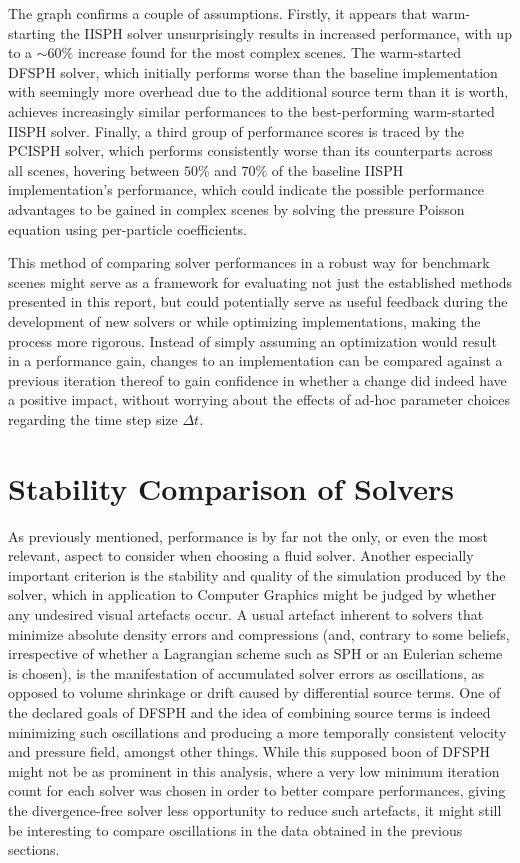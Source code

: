 \documentclass[oneside, a4paper]{book}
\begin{document}
  

  The graph confirms a couple of assumptions. Firstly, it appears that warm-starting the IISPH solver unsurprisingly results in increased performance, with up to a $\sim60\%$ increase found for the most complex scenes. The warm-started DFSPH solver, which initially performs worse than the baseline implementation with seemingly more overhead due to the additional source term than it is worth, achieves increasingly similar performances to the best-performing warm-started IISPH solver. Finally, a third group of performance scores is traced by the PCISPH solver, which performs consistently worse than its counterparts across all scenes, hovering between $50\%$ and $70\%$ of the baseline IISPH implementation's performance, which could indicate the possible performance advantages to be gained in complex scenes by solving the pressure Poisson equation using per-particle coefficients.

  This method of comparing solver performances in a robust way for benchmark scenes might serve as a framework for evaluating not just the established methods presented in this report, but could potentially serve as useful feedback during the development of new solvers or while optimizing implementations, making the process more rigorous. Instead of simply assuming an optimization would result in a performance gain, changes to an implementation can be compared against a previous iteration thereof to gain confidence in whether a change did indeed have a positive impact, without worrying about the effects of ad-hoc parameter choices regarding the time step size $\Delta t$.

  \section{Stability Comparison of Solvers}
  As previously mentioned, performance is by far not the only, or even the most relevant, aspect to consider when choosing a fluid solver. Another especially important criterion is the stability and quality of the simulation produced by the solver, which in application to Computer Graphics might be judged by whether any undesired visual artefacts occur. A usual artefact inherent to solvers that minimize absolute density errors and compressions (and, contrary to some beliefs, irrespective of whether a Lagrangian scheme such as SPH or an Eulerian scheme is chosen), is the manifestation of accumulated solver errors as oscillations, as opposed to volume shrinkage or drift caused by differential source terms. One of the declared goals of DFSPH \autocite{dfsph} and the idea of combining source terms is indeed minimizing such oscillations and producing a more temporally consistent velocity and pressure field, amongst other things. While this supposed boon of DFSPH might not be as prominent in this analysis, where a very low minimum iteration count for each solver was chosen in order to better compare performances, giving the divergence-free solver less opportunity to reduce such artefacts, it might still be interesting to compare oscillations in the data obtained in the previous sections.
\end{document}

